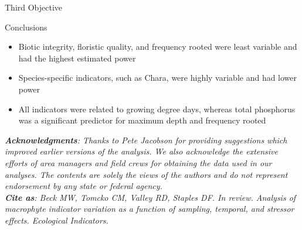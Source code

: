 \documentclass[final,t]{beamer}\usepackage[]{graphicx}\usepackage[]{color}
\begin{document}
\begin{frame}{}
\begin{columns}[t]
\begin{column}{.31\linewidth}
\begin{block}{Third Objective}
\vspace{-2cm}
\end{block}

\begin{block}{Conclusions}
\begin{itemize} 
\item Biotic integrity, floristic quality, and frequency rooted were least variable and had the highest estimated power
\item Species-specific indicators, such as Chara, were highly variable and had lower power  
\item All indicators were related to growing degree days, whereas total phosphorus was a significant predictor for maximum depth and frequency rooted 
\end{itemize}
\end{block}
\vspace{0.7cm}
\footnotesize \textit{\textbf{Acknowledgments}: Thanks to Pete Jacobson for providing suggestions which improved earlier versions of the analysis.  We also acknowledge the extensive efforts of area managers and field crews for obtaining the data used in our analyses.  The contents are solely the views of the authors and do not represent endorsement by any state or federal agency.\\
  \textbf{Cite as}: Beck MW, Tomcko CM, Valley RD, Staples DF. In review. Analysis of macrophyte indicator variation as a function of sampling, temporal, and stressor effects. Ecological Indicators.}

\end{column}

\end{columns}

\end{frame}
\end{document}
